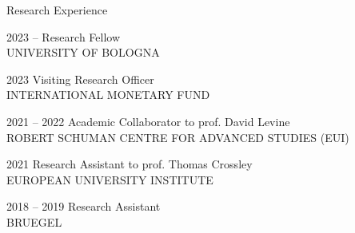 \documentclass[5pt,a4paper]{article}
\begin{document}
\begin{cv}{}
  \begin{cvlist}{Research Experience}
  \item[\small 2023 -- ] \normalsize Research Fellow \\
  \footnotesize UNIVERSITY OF BOLOGNA
  \item[\small 2023] \normalsize Visiting Research Officer\\
  \footnotesize INTERNATIONAL MONETARY FUND
	\item[\small 2021 -- 2022] \normalsize Academic Collaborator to prof. David Levine\\
	\footnotesize ROBERT SCHUMAN CENTRE FOR ADVANCED STUDIES (EUI) \small  	
	\item[\small 2021] \normalsize Research Assistant to prof. Thomas Crossley\\
	\footnotesize EUROPEAN UNIVERSITY INSTITUTE \small  
	\item[\small 2018 -- 2019] \normalsize Research Assistant\\
	\footnotesize BRUEGEL \small
 \end{cvlist}
  


\end{cv}
\end{document}
